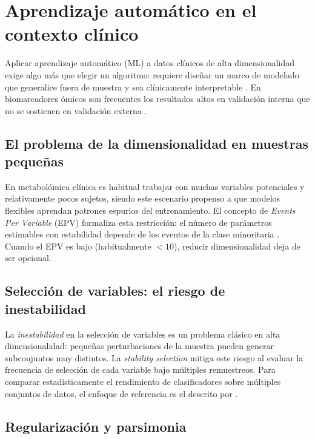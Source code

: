 \section{Aprendizaje automático en el contexto clínico}

Aplicar aprendizaje automático (ML) a datos clínicos de alta dimensionalidad exige algo más que elegir un algoritmo: requiere diseñar un marco de modelado que generalice fuera de muestra y sea clínicamente interpretable \parencite{hastie2009elements}. En biomarcadores ómicos son frecuentes los resultados altos en validación interna que no se sostienen en validación externa \parencite{krstajic2014cross}.

\subsection{El problema de la dimensionalidad en muestras pequeñas}

En metabolómica clínica es habitual trabajar con muchas variables potenciales y relativamente pocos sujetos, siendo este escenario propenso a que modelos flexibles aprendan patrones espurios del entrenamiento. El concepto de \textit{Events Per Variable} (EPV) formaliza esta restricción: el número de parámetros estimables con estabilidad depende de los eventos de la clase minoritaria \parencite{hastie2009elements}. Cuando el EPV es bajo (habitualmente $<10$), reducir dimensionalidad deja de ser opcional.

\subsection{Selección de variables: el riesgo de inestabilidad}

La \textit{inestabilidad} en la selección de variables es un problema clásico en alta dimensionalidad: pequeñas perturbaciones de la muestra pueden generar subconjuntos muy distintos. La \textit{stability selection} \parencite{meinshausen2010stability} mitiga este riesgo al evaluar la frecuencia de selección de cada variable bajo múltiples remuestreos. Para comparar estadísticamente el rendimiento de clasificadores sobre múltiples conjuntos de datos, el enfoque de referencia es el descrito por \textcite{demsar2006statistical}.

\subsection{Regularización y parsimonia}

